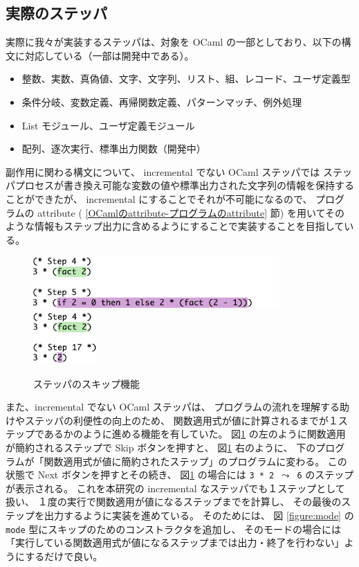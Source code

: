 \subsection{実際のステッパ}
\label{実装-実際のステッパ}

実際に我々が実装するステッパは、対象を OCaml の一部としており、以下の構文に対応している（一部は開発中である）。
\begin{itemize}
\item 整数、実数、真偽値、文字、文字列、リスト、組、レコード、ユーザ定義型
\item 条件分岐、変数定義、再帰関数定義、パターンマッチ、例外処理
\item List モジュール、ユーザ定義モジュール
\item 配列、逐次実行、標準出力関数（開発中）
\end{itemize}

副作用に関わる構文について、
incremental でない OCaml ステッパでは
ステッパプロセスが書き換え可能な変数の値や標準出力された文字列の情報を保持することができたが、
incremental にすることでそれが不可能になるので、
プログラムの attribute ( \ref{OCamlのattribute-プログラムのattribute} 節)
を用いてそのような情報もステップ出力に含めるようにすることで実装することを目指している。

\begin{figure}
  \includegraphics[height=2cm]{5/skip1.png}
  \includegraphics[height=2cm]{5/skip2.png}
  \caption{ステッパのスキップ機能}
  \label{figure:skip}
\end{figure}

また、incremental でない OCaml ステッパは、
プログラムの流れを理解する助けやステッパの利便性の向上のため、
関数適用式が値に計算されるまでが１ステップであるかのように進める機能を有していた。
図\ref{figure:skip} の左のように関数適用が簡約されるステップで Skip ボタンを押すと、
図\ref{figure:skip} 右のように、
下のプログラムが「関数適用式が値に簡約されたステップ」のプログラムに変わる。
この状態で Next ボタンを押すとその続き、
図\ref{figure:skip} の場合には \texttt{3 * 2 $\leadsto$ 6} のステップが表示される。
これを本研究の incremental なステッパでも１ステップとして扱い、
１度の実行で関数適用が値になるステップまでを計算し、
その最後のステップを出力するように実装を進めている。
そのためには、
図 \ref{figure:mode} の \texttt{mode} 型にスキップのためのコンストラクタを追加し、
そのモードの場合には「実行している関数適用式が値になるステップまでは出力・終了を行わない」ようにするだけで良い。
